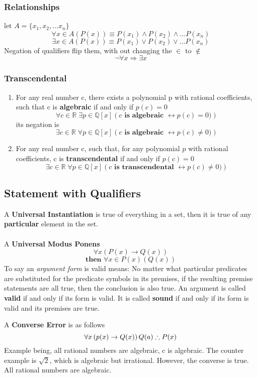 \documentclass[12pt]{book}
\newcommand{\R}{\mathbb{R}}
\newcommand{\Q}{\mathbb{Q}}
\newcommand{\paren}[1]{\left( #1 \right)}
\begin{document}
\subsubsection{Relationships}
let $A = \{x_1, x_2, \ldots x_n \}$
\[
\forall x \in A (P(x)) \equiv P(x_1) \wedge P(x_2)\wedge \ldots P(x_n)
\]
\[
\exists x \in A (P(x)) \equiv P(x_1) \vee P(x_2) \vee \ldots P(x_n)
\]
Negation of qualifiers flip them, with out changing the $\in$ to $\notin$
\[
\neg \forall x \Rightarrow \exists x
\]
\subsubsection{Transcendental}
\begin{enumerate}
    \item For any real number c, there exists a polynomial p with rational coefficients, such that c is \textbf{algebraic} if and only if $p(c)=0$
    \[
    \forall c \in \R \; \exists p \in \Q [x] \paren{c \textbf{ is algebraic } \leftrightarrow p(c) = 0)}
    \]
    its negation is
    \[
    \exists c \in \R \; \forall p \in \Q [x] \paren{c \textbf{ is algebraic } \leftrightarrow p(c) \neq 0)}
    \]
    \item For any real number c, such that, for any polynomial $p$ with rational coefficients, c is \textbf{transcendental} if and only if $p(c)=0$
    \[
    \exists c \in \R \; \forall p \in \Q [x] \paren{c \textbf{ is transcendental } \leftrightarrow p(c) \neq 0)}
    \]
\end{enumerate}

\subsection{Statement with Qualifiers}
A \textbf{Universal Instantiation} is true of everything in a set, then it is true of any \textbf{particular} element in the set.\\
\\
A \textbf{Universal Modus Ponens}
\[
\forall x \paren{P(x) \rightarrow Q(x)}
\]
\[
\textbf{then } \forall x \in P(x) \paren{Q(x)} 
\]
To say an \textit{argument form} is valid means: No matter what particular predicates are substituted for the predicate symbols in its premises, if the resulting premise statements are all true, then the conclusion is also true. An argument is called \textbf{valid} if and only if its form is valid. It is called \textbf{sound} if and only if its form is valid and its premises are true. 

A \textbf{Converse Error} is as follows
\[
\forall x \paren{p(x) \rightarrow Q(x)} \\
Q(a)\\
\therefore P(x)
\]
Example being, all rational numbers are algebraic, c is algebraic. The counter example is $\sqrt{2}$, which is algebraic but irrational. However, the converse is true. All rational numbers are algebraic. \\
\end{document}
